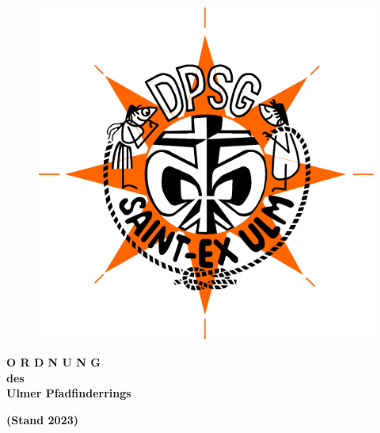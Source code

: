 \begin{titlepage}
\begin{center}
\begin{figure}[h!]
\begin{minipage}{.2\linewidth}
            \end{minipage}%
            \begin{minipage}{.2\linewidth}
                \centering
                \includegraphics[width=\textwidth]{../img/dpsg_st-exupery.jpg}
            \end{minipage}
        \end{figure}
        \vspace{120pt}
        \begin{Huge}
            \textbf{
                O R D N U N G \\
                \vspace{20pt}
                des\\ 
                \vspace{20pt}
                Ulmer Pfadfinderrings\\
                \vspace{20pt}
            }
        \end{Huge}
        \begin{Large}
            \textbf{
                (Stand 2023)
            }
        \end{Large}
        \vspace{100pt}
    \end{center}
    \vspace{150pt}
    \vspace*{\fill}
\end{titlepage}
